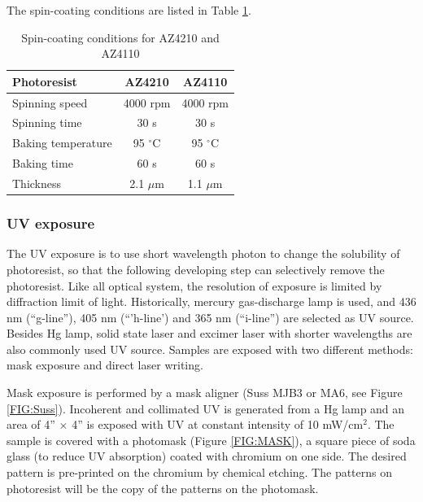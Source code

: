 \documentclass[pdflatex, sectionletters, 12pt]{pittetd}    %
\begin{document}
The spin-coating conditions are listed in Table \ref{TAB:photoresistsCoating}.

\begin{table}
	\centering
	\begin{tabular}{l|cc}
		\hline
		Photoresist	&	AZ4210	&	AZ4110 \\ \hline
		Spinning speed	&	4000 rpm	& 4000 rpm	\\ 
		Spinning time	&	30 s	&	30 s	\\
		Baking temperature	&	95 $^{\circ}$C	&	95 $^{\circ}$C \\ 
		Baking time	&	60 s	&	60 s	\\
		Thickness	&	2.1 $\mu$m	&	1.1 $\mu$m \\ \hline
	\end{tabular}
	\caption{Spin-coating conditions for AZ4210 and AZ4110}
	\label{TAB:photoresistsCoating}

\end{table}


\subsubsection{UV exposure}

The UV exposure is to use short wavelength photon to change the solubility of photoresist, so that the following developing step can selectively remove the photoresist. Like all optical system, the resolution of exposure is limited by diffraction limit of light. Historically, mercury gas-discharge lamp is used, and 436 nm (``g-line''), 405 nm (``'h-line') and 365 nm (``i-line'') are selected as UV source. Besides Hg lamp, solid state laser and excimer laser with shorter wavelengths are also commonly used UV source. Samples are exposed with two different methods: mask exposure and direct laser writing. 

Mask exposure is performed by a mask aligner (Suss MJB3 or MA6, see Figure \ref{FIG:Suss}). Incoherent and collimated UV is generated from a Hg lamp and an area of 4'' $\times$ 4'' is exposed with UV at constant intensity of 10 mW/cm$^2$. The sample is covered with a photomask (Figure \ref{FIG:MASK}), a square piece of soda glass (to reduce UV absorption) coated with chromium on one side. The desired pattern is pre-printed on the chromium by chemical etching. The patterns on photoresist will be the copy of the patterns on the photomask. 
\end{document}

